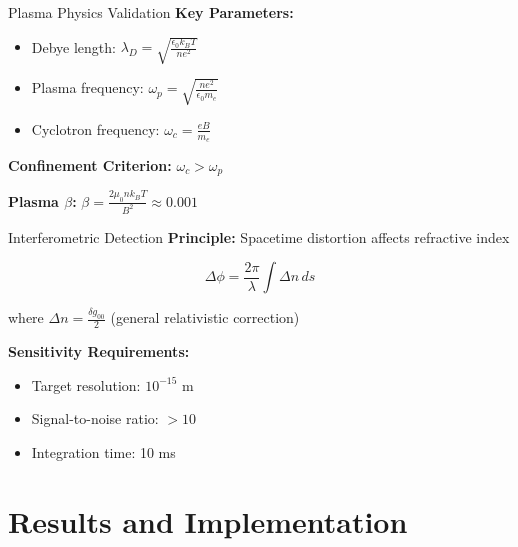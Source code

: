 \documentclass[aspectratio=169,xcolor={table,dvipsnames}]{beamer}
\begin{document}
\begin{frame}{Plasma Physics Validation}
    \textbf{Key Parameters:}
    \begin{itemize}
        \item Debye length: $\lambda_D = \sqrt{\frac{\epsilon_0 k_B T}{n e^2}}$
        \item Plasma frequency: $\omega_p = \sqrt{\frac{n e^2}{\epsilon_0 m_e}}$
        \item Cyclotron frequency: $\omega_c = \frac{e B}{m_e}$
    \end{itemize}
    
    \vspace{0.3cm}
    \textbf{Confinement Criterion:} $\omega_c > \omega_p$
    
    \textbf{Plasma $\beta$:} $\beta = \frac{2\mu_0 n k_B T}{B^2} \approx 0.001$
\end{frame}

\begin{frame}{Interferometric Detection}
    \textbf{Principle:} Spacetime distortion affects refractive index
    
    \begin{equation}
        \Delta \phi = \frac{2\pi}{\lambda} \int \Delta n \, ds
    \end{equation}
    
    where $\Delta n = \frac{\delta g_{00}}{2}$ (general relativistic correction)
    
    \vspace{0.3cm}
    \textbf{Sensitivity Requirements:}
    \begin{itemize}
        \item Target resolution: $10^{-15}$ m
        \item Signal-to-noise ratio: $>10$
        \item Integration time: 10 ms
    \end{itemize}
\end{frame}

\section{Results and Implementation}
\end{document}
